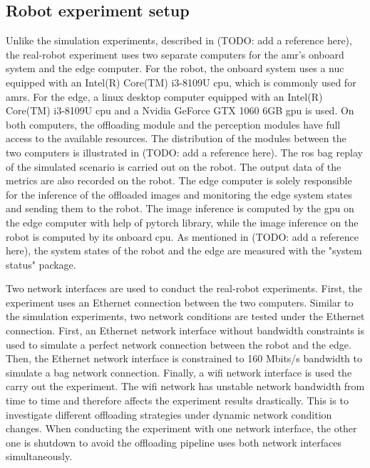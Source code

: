 \subsection{Robot experiment setup}

Unlike the simulation experiments, described in (TODO: add a reference here), the real-robot experiment uses two separate computers for the \gls{amr}'s onboard system and the edge computer. For the robot, the onboard system uses a \gls{nuc} equipped with an Intel(R) Core(TM) i3-8109U \gls{cpu}, which is commonly used for \glspl{amr}.  For the edge, a \gls{linux} desktop computer equipped with an Intel(R) Core(TM) i3-8109U \gls{cpu} and a Nvidia GeForce GTX 1060 6GB \gls{gpu} is used. On both computers, the offloading module and the perception modules have full access to the available resources. The distribution of the modules between the two computers is illustrated in (TODO: add a reference here). The \gls{ros} bag replay of the simulated scenario is carried out on the robot. The output data of the metrics are also recorded on the robot. The edge computer is solely responsible for the inference of the offloaded images and monitoring the edge system states and sending them to the robot. The image inference is computed by the \gls{gpu} on the edge computer with help of \gls{pytorch} library, while the image inference on the robot is computed by its onboard \gls{cpu}. As mentioned in (TODO: add a reference here), the system states of the robot and the edge are measured with the "system status" package.


Two network interfaces are used to conduct the real-robot experiments. First, the experiment uses an Ethernet connection between the two computers. Similar to the simulation experiments, two network conditions are tested under the Ethernet connection. First, an Ethernet network interface without bandwidth constraints is used to simulate a perfect network connection between the robot and the edge. Then, the Ethernet network interface is constrained to 160 Mbits/s bandwidth to simulate a bag network connection. Finally, a \gls{wifi} network interface is used the carry out the experiment. The \gls{wifi} network has unstable network bandwidth from time to time and therefore affects the experiment results drastically. This is to investigate different offloading strategies under dynamic network condition changes. When conducting the experiment with one network interface, the other one is shutdown to avoid the offloading pipeline uses both network interfaces simultaneously. 

